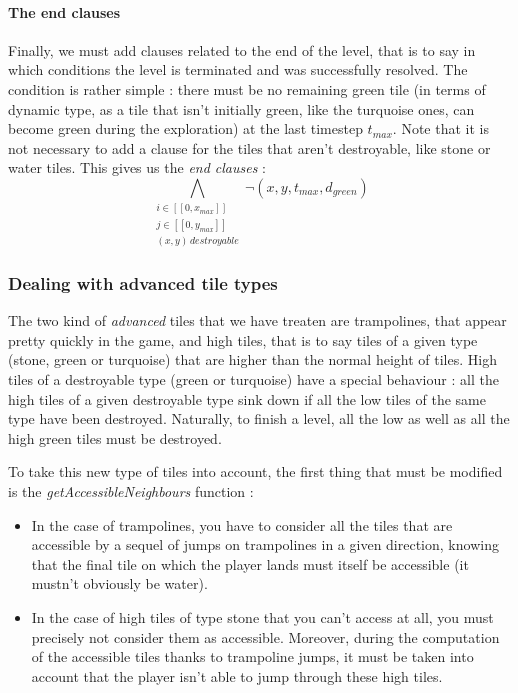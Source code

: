 \documentclass[a4paper, 12pt, titlepage]{article}
\begin{document}
\paragraph{The end clauses}
Finally, we must add clauses related to the end of the level, that is to say in
which conditions the level is terminated and was successfully resolved. The
condition is rather simple : there must be no remaining green tile (in terms of
dynamic type, as a tile that isn't initially green, like the turquoise ones, can
become green during the exploration) at the last timestep $t_{max}$. Note that
it is not necessary to add a clause for the tiles that aren't destroyable, like
stone or water tiles. This gives us the {\em end clauses} :
\begin{equation}
\bigwedge \limits_{\substack{i \in [\![0, x_{max}]\!]\\
			     j \in [\![0, y_{max}]\!]\\
			     (x, y) \, destroyable}}
\neg(x, y, t_{max}, d_{green})
\end{equation}


\subsubsection{Dealing with advanced tile types}
The two kind of {\em advanced} tiles that we have treaten are trampolines, that
appear pretty quickly in the game, and high tiles, that is to say tiles of a
given type (stone, green or turquoise) that are higher than the normal height of
tiles. High tiles of a destroyable type (green or turquoise) have a special
behaviour : all the high tiles of a given destroyable type sink down if all the
low tiles of the same type have been destroyed. Naturally, to finish a level,
all the low as well as all the high green tiles must be destroyed.

To take this new type of tiles into account, the first thing that must be
modified is the {\em getAccessibleNeighbours} function :
\begin{itemize}
\item In the case of trampolines, you have to consider all the tiles that are
      accessible by a sequel of jumps on trampolines in a given direction,
      knowing that the final tile on which the player lands must itself be
      accessible (it mustn't obviously be water).
\item In the case of high tiles of type stone that you can't access at all, you
      must precisely not consider them as accessible. Moreover, during the
      computation of the accessible tiles thanks to trampoline jumps, it must be
      taken into account that the player isn't able to jump through these high
      tiles.
\end{itemize}
\end{document}
